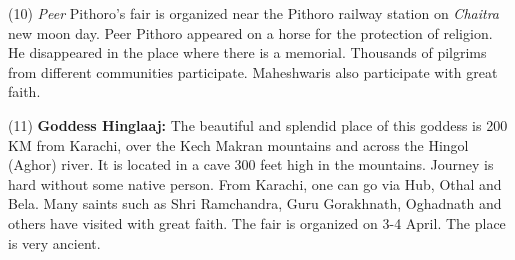 (10) \textit{Peer} Pithoro's fair is organized near the Pithoro railway station on
\textit{Chaitra} new moon day. Peer Pithoro appeared on a horse for the
protection of religion. He disappeared in the place where there is a memorial.
Thousands of pilgrims from different communities participate. Maheshwaris also
participate with great faith. 

(11) \textbf{Goddess Hinglaaj:} The beautiful and splendid place of this
goddess is 200 KM from Karachi, over the Kech Makran mountains and across the
Hingol (Aghor) river. It is located in a cave 300 feet high in the mountains.
Journey is hard without some native person. From Karachi, one can go via Hub,
Othal and Bela. Many saints such as Shri Ramchandra, Guru Gorakhnath, Oghadnath
and others have visited with great faith. The fair is organized on 3-4 April.
The place is very ancient.

